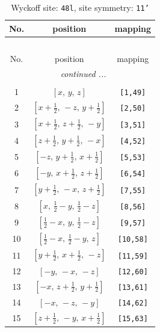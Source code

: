 \documentclass[fleqn,8pt]{jsarticle}
\begin{document}
\renewcommand{\arraystretch}{1.2}
\begin{longtable}{ccc}
\caption{Wyckoff site: {\tt 48l}, site symmetry: {\tt 11'}}
 \\
 \hline \hline
No. & position & mapping \\ \hline \endfirsthead

\multicolumn{2}{l}{\tablename\ \thetable{}} \\
 \hline \hline
No. & position & mapping \\ \hline \endhead

 \hline \hline
\multicolumn{2}{r}{\footnotesize\it continued ...} \\ \endfoot

 \hline \hline
\multicolumn{2}{r}{} \\ \endlastfoot

1 & $\left[ x,\, y,\, z \right]$ & {\tt [1,49]} \\ \hline
2 & $\left[ x + \frac{1}{2},\, - z,\, y + \frac{1}{2} \right]$ & {\tt [2,50]} \\ \hline
3 & $\left[ x + \frac{1}{2},\, z + \frac{1}{2},\, - y \right]$ & {\tt [3,51]} \\ \hline
4 & $\left[ z + \frac{1}{2},\, y + \frac{1}{2},\, - x \right]$ & {\tt [4,52]} \\ \hline
5 & $\left[ - z,\, y + \frac{1}{2},\, x + \frac{1}{2} \right]$ & {\tt [5,53]} \\ \hline
6 & $\left[ - y,\, x + \frac{1}{2},\, z + \frac{1}{2} \right]$ & {\tt [6,54]} \\ \hline
7 & $\left[ y + \frac{1}{2},\, - x,\, z + \frac{1}{2} \right]$ & {\tt [7,55]} \\ \hline
8 & $\left[ x,\, \frac{1}{2} - y,\, \frac{1}{2} - z \right]$ & {\tt [8,56]} \\ \hline
9 & $\left[ \frac{1}{2} - x,\, y,\, \frac{1}{2} - z \right]$ & {\tt [9,57]} \\ \hline
10 & $\left[ \frac{1}{2} - x,\, \frac{1}{2} - y,\, z \right]$ & {\tt [10,58]} \\ \hline
11 & $\left[ y + \frac{1}{2},\, x + \frac{1}{2},\, - z \right]$ & {\tt [11,59]} \\ \hline
12 & $\left[ - y,\, - x,\, - z \right]$ & {\tt [12,60]} \\ \hline
13 & $\left[ - x,\, z + \frac{1}{2},\, y + \frac{1}{2} \right]$ & {\tt [13,61]} \\ \hline
14 & $\left[ - x,\, - z,\, - y \right]$ & {\tt [14,62]} \\ \hline
15 & $\left[ z + \frac{1}{2},\, - y,\, x + \frac{1}{2} \right]$ & {\tt [15,63]} \\ \hline

\end{longtable}
\end{document}
